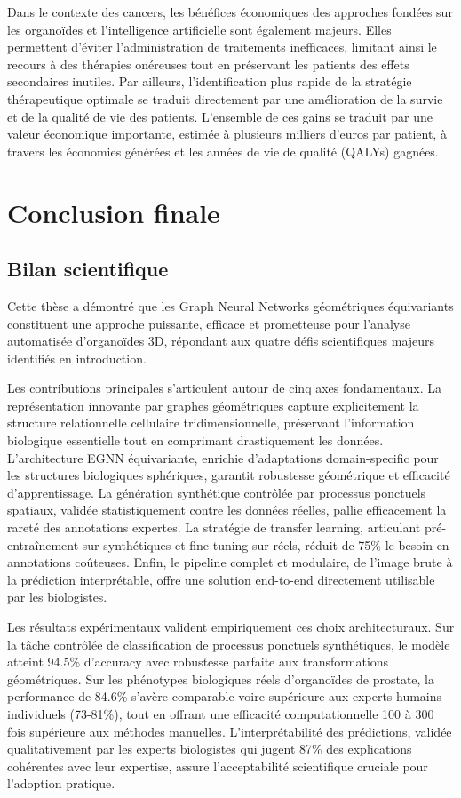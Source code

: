 Dans le contexte des cancers, les bénéfices économiques des approches fondées sur les organoïdes et l’intelligence artificielle sont également majeurs. Elles permettent d’éviter l’administration de traitements inefficaces, limitant ainsi le recours à des thérapies onéreuses tout en préservant les patients des effets secondaires inutiles. Par ailleurs, l’identification plus rapide de la stratégie thérapeutique optimale se traduit directement par une amélioration de la survie et de la qualité de vie des patients. L’ensemble de ces gains se traduit par une valeur économique importante, estimée à plusieurs milliers d’euros par patient, à travers les économies générées et les années de vie de qualité (QALYs) gagnées.

\section{Conclusion finale}

\subsection{Bilan scientifique}

Cette thèse a démontré que les Graph Neural Networks géométriques équivariants constituent une approche puissante, efficace et prometteuse pour l'analyse automatisée d'organoïdes 3D, répondant aux quatre défis scientifiques majeurs identifiés en introduction.

Les contributions principales s'articulent autour de cinq axes fondamentaux. La représentation innovante par graphes géométriques capture explicitement la structure relationnelle cellulaire tridimensionnelle, préservant l'information biologique essentielle tout en comprimant drastiquement les données. L'architecture EGNN équivariante, enrichie d'adaptations domain-specific pour les structures biologiques sphériques, garantit robustesse géométrique et efficacité d'apprentissage. La génération synthétique contrôlée par processus ponctuels spatiaux, validée statistiquement contre les données réelles, pallie efficacement la rareté des annotations expertes. La stratégie de transfer learning, articulant pré-entraînement sur synthétiques et fine-tuning sur réels, réduit de 75\% le besoin en annotations coûteuses. Enfin, le pipeline complet et modulaire, de l'image brute à la prédiction interprétable, offre une solution end-to-end directement utilisable par les biologistes.

Les résultats expérimentaux valident empiriquement ces choix architecturaux. Sur la tâche contrôlée de classification de processus ponctuels synthétiques, le modèle atteint 94.5\% d'accuracy avec robustesse parfaite aux transformations géométriques. Sur les phénotypes biologiques réels d'organoïdes de prostate, la performance de 84.6\% s'avère comparable voire supérieure aux experts humains individuels (73-81\%), tout en offrant une efficacité computationnelle 100 à 300 fois supérieure aux méthodes manuelles. L'interprétabilité des prédictions, validée qualitativement par les experts biologistes qui jugent 87\% des explications cohérentes avec leur expertise, assure l'acceptabilité scientifique cruciale pour l'adoption pratique.

